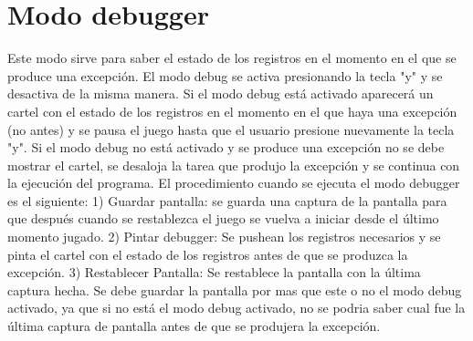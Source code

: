 \documentclass[a4paper]{article}
\begin{document}
\section{Modo debugger}

Este modo sirve para saber el estado de los registros en el momento en el que se produce una excepción. El modo debug se activa presionando la tecla "y" y se desactiva de la misma manera. Si el modo debug está activado aparecerá un cartel con el estado de los registros en el momento en el que haya una excepción (no antes) y se pausa el juego hasta que el usuario presione nuevamente la tecla "y". Si el modo debug no está activado y se produce una excepción no se debe mostrar el cartel, se desaloja la tarea que produjo la excepción y se continua con la ejecución del programa.
El procedimiento cuando se ejecuta el modo debugger es el siguiente:
1) Guardar pantalla: se guarda una captura de la pantalla para que después cuando se restablezca el juego se vuelva a iniciar desde el último momento jugado.
2) Pintar debugger: Se pushean los registros necesarios y se pinta el cartel con el estado de los registros antes de que se produzca la excepción. 
3) Restablecer Pantalla: Se restablece la pantalla con la última captura hecha. Se debe guardar la pantalla por mas que este o no el modo debug activado, ya que si no está el modo debug activado, no se podria saber cual fue la última captura de pantalla antes de que se produjera la excepción.
\end{document}
